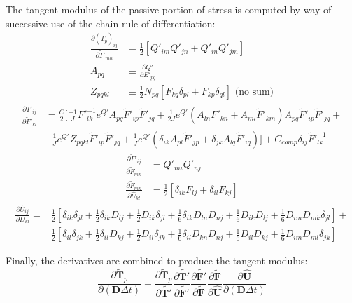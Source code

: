 The tangent modulus of the passive portion of stress is computed by way of successive use of the chain rule of differentiation:
\begin{align}
\frac{\partial (\tilde{T}_p)_{ij}}{\partial \tilde{T}'_{mn}} &= \frac{1}{2}\left[Q'_{im}Q'_{jn} + Q'_{in}Q'_{jm}\right] \\
A_{pq} &\equiv \frac{\partial Q'}{\partial E'_{pq}} \\
Z_{pqkl} &\equiv \frac{1}{2}N_{pq}\left[F_{kq}\delta_{pl} + F_{kp}\delta_{ql}\right] \text{ (no sum)}
\end{align}
\begin{equation}
\begin{aligned}
\frac{\partial \tilde{T}'_{ij}}{\partial \tilde{F}'_{kl}} &= \frac{C}{2} \Bigg[\frac{-1}{J}\tilde{F}'^{-1}_{lk}e^{Q'}A_{pq}\tilde{F}'_{ip}\tilde{F}'_{jq} + \frac{1}{2J} e^{Q'}(A_{ln}\tilde{F}'_{kn} + A_{ml}\tilde{F}'_{km})A_{pq}\tilde{F}'_{ip}\tilde{F}'_{jq} + \\
&\text{\ \ \ }\frac{1}{J}e^{Q'}Z_{pqkl}\tilde{F}'_{ip}\tilde{F}'_{jq} + \frac{1}{J}e^{Q'}(\delta_{ik}A_{pl}\tilde{F}'_{jp} + \delta_{jk}A_{lq}\tilde{F}'_{iq})\Bigg] + C_{comp}\delta_{ij}\tilde{F}'^{-1}_{lk}
\end{aligned}
\end{equation}
\begin{align}
\frac{\partial \tilde{F}'_{ij}}{\partial \tilde{F}_{mn}} &= Q'_{mi}Q'_{nj} \\
\frac{\partial \tilde{F}_{mn}}{\partial \hat{U}_{kl}} &= \frac{1}{2}\left[\delta_{ik}\overline{F}_{lj} + \delta_{il}\overline{F}_{kj}\right]
\end{align}
\begin{equation}
\begin{aligned}
\frac{\partial \hat{U}_{ij}}{\partial D_{kl}} = &\frac{1}{2}\left[\delta_{ik}\delta_{jl} + \frac{1}{2}\delta_{ik}D_{lj} + \frac{1}{2}D_{ik}\delta_{jl} + \frac{1}{6}\delta_{ik}D_{ln}D_{nj} + \frac{1}{6}D_{ik}D_{lj} + \frac{1}{6}D_{im}D_{mk}\delta_{jl}\right] + \\
&\frac{1}{2}\left[\delta_{il}\delta_{jk} + \frac{1}{2}\delta_{il}D_{kj} + \frac{1}{2}D_{il}\delta_{jk} + \frac{1}{6}\delta_{il}D_{kn}D_{nj} + \frac{1}{6}D_{il}D_{kj} + \frac{1}{6}D_{im}D_{ml}\delta_{jk}\right]
\end{aligned}
\end{equation}

Finally, the derivatives are combined to produce the tangent modulus:
\begin{equation}
\frac{\partial \tilde{\bm{T}}_p}{\partial (\bm{D}\Delta{t})} = \frac{\partial \tilde{\bm{T}}_p}{\partial \tilde{\bm{T}'}}\frac{\partial \tilde{\bm{T}'}}{\partial \tilde{\bm{F}'}}\frac{\partial \tilde{\bm{F}'}}{\partial \tilde{\bm{F}}}\frac{\partial \tilde{\bm{F}}}{\partial \hat{\bm{U}}}\frac{\partial \hat{\bm{U}}}{\partial (\bm{D}\Delta{t})}
\end{equation}

